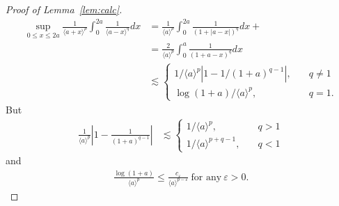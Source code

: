\documentclass[12pt,reqno]{amsart}
\numberwithin{equation}{section}  %
\numberwithin{figure}{section}
\newcommand{\ee}{\varepsilon}
\begin{document}
\begin{proof}[Proof of Lemma~\ref{lem:calc}]
\begin{equation*}
  \begin{split}
  \sup_{0 \le x \le 2a} \frac{1}{\langle a + x \rangle
  ^{p}} \int_{0}^{2a} \frac{1}{\langle a - x \rangle ^{q}} d x
  & = \frac{1}{\langle a \rangle ^{p}} \int_{0}^{2a} \frac{1}{(1 + | a -
  x
  |)^{q}} d x + 
  \\
  & = \frac{2}{\langle a \rangle ^{p}} \int_{0}^{a} \frac{1}{(1 + a -
  x)^{q}} d x
  \\
  & \lesssim
  \begin{cases}
    1/{\langle a \rangle ^{p}} \left| 1 - 1/{(1 +
    a)^{q -1}} \right|, \quad & q \neq 1
    \\
    \log(1+a)/{\langle a \rangle^{p} }, \quad & q =1.
  \end{cases}
  \end{split}
\end{equation*}
%
But
%
%
\begin{equation*}
\begin{split}
\frac{1}{\langle a \rangle ^{p}}\left| 1 - \frac{1}{(1 +
    a)^{q -1}} \right|
    & \lesssim
    \begin{cases}
      1/{\langle a \rangle^{p} }, \quad & q > 1
      \\
      1/{\langle a \rangle ^{p + q -1}}, \quad & q < 1
    \end{cases}
\end{split}
\end{equation*}
%
%
and
%
%
\begin{equation*}
\begin{split}
  \frac{\log(1 + a)}{\langle a \rangle^{p} } \le  \frac{c_{\ee}}{\langle a
    \rangle ^{p - \ee}} \ \text{for any} \ \ee > 0.
\end{split}
\end{equation*}


\end{proof}
\end{document}
